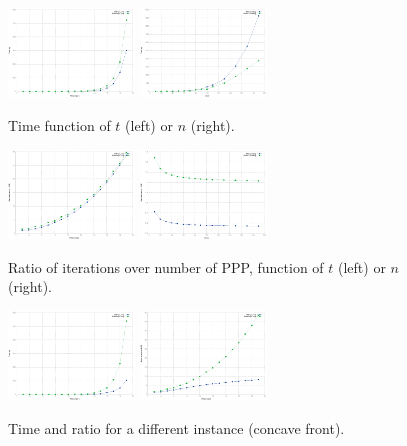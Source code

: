 \documentclass{llncs}
\begin{document}
\begin{figure}[h!]
  \centering
      \includegraphics[width=0.30\textwidth]{speed_T}
      \includegraphics[width=0.30\textwidth]{speed_N}
 \caption{\label{speed1} Time function of $t$ (left) or $n$ (right).}
\end{figure}
\begin{figure}[h!]
  \centering
      \includegraphics[width=0.30\textwidth]{ratioIte_T}
      \includegraphics[width=0.30\textwidth]{ratioIte_N}
    \caption{\label{ratio1} Ratio of iterations over number of PPP, function of $t$ (left) or $n$ (right).}
\end{figure}
\begin{figure}[h!]
  \centering
      \includegraphics[width=0.30\textwidth]{speed_log_T}
      \includegraphics[width=0.30\textwidth]{ratioIte_log_T}
    \caption{\label{speed2} Time and ratio for a different instance (concave front).}
\end{figure}
\end{document}

